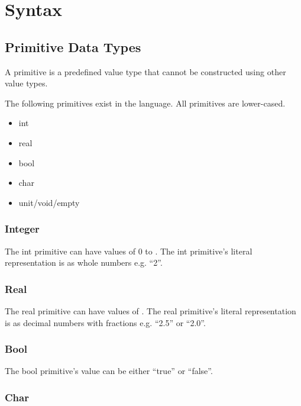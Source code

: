 \section{Syntax}
\label{sec:syntax}

\subsection{Primitive Data Types}
\label{subsec:primitives}

A primitive is a predefined value type that cannot be constructed using other value types.

The following primitives exist in the language. All primitives are lower-cased.

\begin{itemize}
  \item int
  \item real
  \item bool
  \item char
  \item unit/void/empty 
\end{itemize}

\subsubsection{Integer}
\label{subsubsec:int}

The int primitive can have values of 0 to . The int primitive's literal representation is as whole numbers e.g. \enquote{2}.

\subsubsection{Real}
\label{subsubsec:real}

The real primitive can have values of . The real primitive's literal representation is as decimal numbers with fractions e.g. \enquote{2.5} or \enquote{2.0}.

\subsubsection{Bool}
\label{subsubsec:bool}

The bool primitive's value can be either \enquote{true} or \enquote{false}.

\subsubsection{Char}
\label{sec:char}

